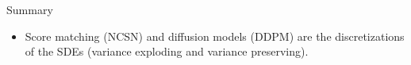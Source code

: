 \begin{frame}{Summary}
	\begin{itemize}
		\item Score matching (NCSN) and diffusion models (DDPM) are the discretizations of the SDEs (variance exploding and variance preserving).
	\end{itemize}
\end{frame}
 